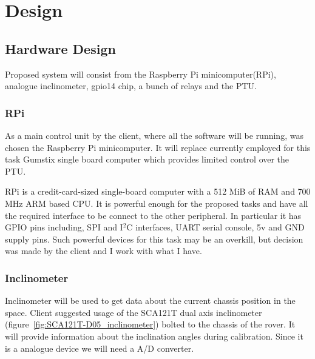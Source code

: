 \chapter{Design}

\section{Hardware Design}
Proposed system will consist from the Raspberry Pi minicomputer(RPi), analogue inclinometer, gpio14 chip, a bunch of relays and the PTU.

\subsection{RPi}

 
As a main control unit by the client, where all the software will be running, was chosen the Raspberry Pi minicomputer. It will replace currently employed for this task Gumstix single board computer which provides limited control over the PTU. 

RPi is a credit-card-sized single-board computer with a 512 MiB of RAM and 700 MHz ARM based CPU. It is powerful enough for the proposed tasks and have all the required interface to be connect to the other peripheral. In particular it has GPIO pins including, SPI and I$^2$C interfaces, UART serial console, 5v and GND supply pins. Such powerful devices for this task may be an overkill, but decision was made by the client and I work with what I have.

\subsection{Inclinometer}
Inclinometer will be used to get data about the current chassis position in the space. Client suggested usage of the SCA121T dual axis inclinometer (figure~\ref{fig:SCA121T-D05_inclinometer}) bolted to the chassis of the rover. It will provide information about the inclination angles during calibration. Since it is a analogue device we will need a A/D converter. 


